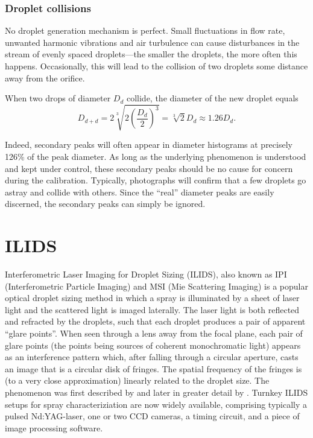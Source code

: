 \documentclass[11.5pt,oneside]{book}
\begin{document}
\subsection{Droplet collisions}
\label{sec:droplet-collisions}
No droplet generation mechanism is perfect. Small fluctuations in flow rate,
unwanted harmonic vibrations and air turbulence can cause disturbances in the
stream of evenly spaced droplets---the smaller the droplets, the more often
this happens. Occasionally, this will lead to the collision
of two droplets some distance away from the orifice.

When two drops of diameter $D_d$ collide, the diameter of the new droplet equals
\begin{equation}
    D_{d+d} = 2\sqrt[3]{2\left(\frac{D_d}{2}\right)^3} = \sqrt[3]{2} D_d \approx
    1.26 D_d.
\end{equation}

Indeed, secondary peaks will often appear in diameter histograms at precisely 126\% of
the peak diameter. As long as the underlying phenomenon is understood and kept
under control, these secondary peaks should be no cause for concern during the
calibration. Typically, photographs will confirm that a few droplets go astray
and collide with others. Since the ``real'' diameter peaks are easily discerned,
the secondary peaks can simply be ignored.

\chapter[ILIDS]{ILIDS}
Interferometric Laser Imaging for Droplet Sizing (ILIDS), also known
as IPI (Interferometric Particle Imaging) and MSI (Mie Scattering
Imaging) is a popular optical droplet sizing method in which a spray
is illuminated by a sheet of laser light and the scattered light is
imaged laterally. The laser light is both reflected and refracted by the
droplets, such that each droplet produces a pair of apparent ``glare
points''. When seen through a lens away from the focal plane, each pair
of glare points (the points being sources of coherent monochromatic
light) appears as an interference pattern which, after falling through
a circular aperture, casts an image that is a circular disk of fringes.
The spatial frequency of the fringes is (to a very close approximation)
linearly related to the droplet size. The phenomenon was first described
by \citet{Konig86} and later in greater detail by \citet{Glover95}.
Turnkey ILIDS setups for spray characteriziation are now widely
available, comprising typically a pulsed Nd:YAG-laser, one or two CCD
cameras, a timing circuit, and a piece of image processing software.
\end{document}
